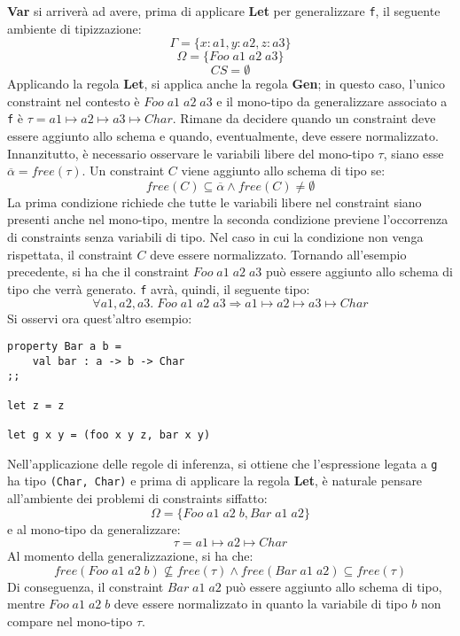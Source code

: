 \documentclass[10pt,a4paper]{article}
\begin{document}
\textbf{Var} si arriverà ad avere, prima di applicare \textbf{Let} per generalizzare \texttt{f}, il seguente
ambiente di tipizzazione:
\[ \Gamma = \{ x : a1, y : a2, z : a3 \} \]
\[ \Omega = \{ Foo \; a1 \; a2 \; a3 \} \]
\[ CS = \emptyset \]
Applicando la regola \textbf{Let}, si applica anche la regola \textbf{Gen}; in questo caso, l'unico constraint
nel contesto è $ Foo \; a1 \; a2 \; a3 $ e il mono-tipo da generalizzare associato a \texttt{f} è
$ \tau = a1 \mapsto a2 \mapsto a3 \mapsto Char $. Rimane da decidere quando un constraint deve essere aggiunto allo
schema e quando, eventualmente, deve essere normalizzato. Innanzitutto, è necessario osservare le variabili libere
del mono-tipo $ \tau $, siano esse $ \overline{\alpha} = free(\tau) $. Un constraint $ C $ viene aggiunto allo schema
di tipo se:
\[ free(C) \subseteq \overline{\alpha} \wedge free(C) \neq \emptyset \]
La prima condizione richiede che tutte le variabili libere nel constraint siano presenti anche nel mono-tipo, mentre
la seconda condizione previene l'occorrenza di constraints senza variabili di tipo. Nel caso in cui la condizione non
venga rispettata, il constraint $ C $ deve essere normalizzato. Tornando all'esempio precedente, si ha che
il constraint $ Foo \; a1 \; a2 \; a3 $ può essere aggiunto allo schema di tipo che verrà generato.
\texttt{f} avrà, quindi, il seguente tipo:
\[ \forall a1, a2, a3. \; Foo \; a1 \; a2 \; a3 \Rightarrow a1 \mapsto a2 \mapsto a3 \mapsto Char \]
Si osservi ora quest'altro esempio:
\begin{lstlisting}
property Bar a b =
    val bar : a -> b -> Char
;;

let z = z

let g x y = (foo x y z, bar x y)
\end{lstlisting}
Nell'applicazione delle regole di inferenza, si ottiene che l'espressione legata a \texttt{g} ha tipo
\texttt{(Char, Char)} e prima di applicare la regola \textbf{Let}, è naturale pensare all'ambiente dei problemi di
constraints siffatto:
\[ \Omega = \{ Foo \; a1 \; a2 \; b, Bar \; a1 \; a2 \} \]
e al mono-tipo da generalizzare:
\[ \tau = a1 \mapsto a2 \mapsto Char \]
Al momento della generalizzazione, si ha che:
\[ free(Foo \; a1 \; a2 \; b) \not\subseteq free(\tau) \wedge free(Bar \; a1 \; a2) \subseteq free(\tau) \]
Di conseguenza, il constraint $ Bar \; a1 \; a2 $ può essere aggiunto allo schema di tipo, mentre
$ Foo \; a1 \; a2 \; b $ deve essere normalizzato in quanto la variabile di tipo $ b $ non compare nel mono-tipo $ \tau $.
\end{document}
